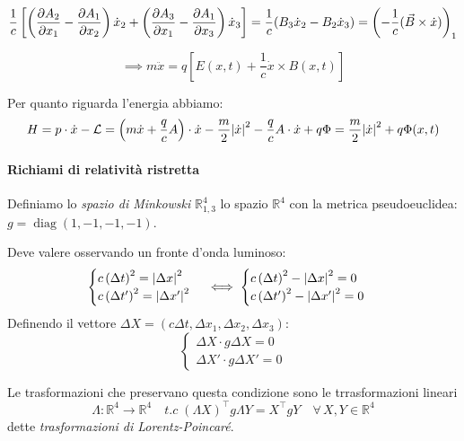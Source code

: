 \begin{equation*}
\frac{1}{c} \left[ 
\left( \pdv{A_2}{x_1} - \pdv{A_1}{x_2} \right) \dot{x}_2 
+ \left( \pdv{A_3}{x_1} - \pdv{A_1}{x_3} \right) \dot{x}_3
\right] = \frac{1}{c} (B_3 \dot{x}_2 - B_2 \dot{x}_3) = \left( - \frac{1}{c} (\vec{B} \times \dot{x}) \right)_1
\end{equation*}

\begin{equation*}
\implies m \ddot{x} = q \left[ E(x,t) + \frac{1}{c} \dot{x} \times B(x,t) \right]
\end{equation*}

Per quanto riguarda l'energia abbiamo:
\begin{equation}
    H = p\cdot\dot{x}-\mathcal{L}=\left( m\dot{x}+\frac{q}{c}A \right)\cdot \dot{x}- \frac{m}{2}\abs{\dot{x}}^2-\frac{q}{c}A\cdot\dot{x}+q\Phi
    = \frac{m}{2}\abs{\dot{x}}^2 + q\Phi(x,t)
\end{equation}

\paragraph{Richiami di relatività ristretta}
\begin{definition}
    Definiamo lo \textit{spazio di Minkowski} $\mathbb{R}^4_{1,3}$ lo spazio $\mathbb{R}^4$ con la metrica pseudoeuclidea: $g = \operatorname{diag}(1,-1,-1,-1)$.
\end{definition}

Deve valere osservando un fronte d'onda luminoso:
\begin{equation}
    \begin{cases}
        c\left( \Delta t \right)^2 = \abs{\Delta x}^2\\
        c\left( \Delta t' \right)^2 = \abs{\Delta x'}^2
    \end{cases}\iff\begin{cases}
        c\left( \Delta t \right)^2 - \abs{\Delta x}^2=0\\
        c\left( \Delta t' \right)^2 - \abs{\Delta x'}^2=0
    \end{cases}
\end{equation}
Definendo il vettore $\Delta X= (c\Delta t, \Delta x_1,\Delta x_2,\Delta x_3)$:
\begin{equation}
    \begin{cases}
        \Delta X \cdot g\Delta X=0\\
        \Delta X' \cdot g\Delta X'=0
    \end{cases}
\end{equation}
\begin{definition}
    Le trasformazioni che preservano questa condizione sono le trrasformazioni lineari 
    \begin{equation}
        \Lambda: \mathbb{R}^4\to \mathbb{R}^4\quad t.c\; (\Lambda X)^\intercal g \Lambda Y = X^\intercal g Y \quad \forall\,X,Y\in \mathbb{R}^4
    \end{equation}
    dette \textit{trasformazioni di Lorentz-Poincaré}.
\end{definition}

